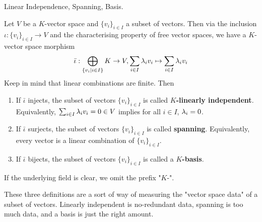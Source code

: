 \documentclass[../book.tex]{subfiles}
\begin{document}
\begin{dfn} Linear Independence, Spanning, Basis.
    
    Let $V$ be a $K$-vector space and $\{v_i\}_{i\in I}$ a subset of vectors.
    Then via the inclusion $\iota : \{v_i\}_{i\in I} \to V$ and
    the characterising property of free vector spaces, 
    we have a $K$-vector space morphism \[
        \bar\iota : \bigoplus_{\{v_i \mid i\in I\}} K \to V, 
        \sum_{i\in I}\lambda_i v_i \mapsto \sum_{i\in I}\lambda_i v_i
    \]
    Keep in mind that linear combinations are finite. 
    Then \begin{enumerate}
        \item If $\bar\iota$ injects,
        the subset of vectors $\{v_i\}_{i\in I}$ 
        is called \textbf{$K$-linearly independent}. 
        Equivalently, 
        $\sum_{i\in I} \lambda_i v_i = 0 \in V$ implies for all $i \in I$, $\lambda_i = 0$.
        \item If $\bar\iota$ surjects, 
        the subset of vectors $\{v_i\}_{i\in I}$ is called \textbf{spanning}.
        Equivalently, every vector is a linear combination of $\{v_i\}_{i\in I}$. 
        \item If $\bar\iota$ bijects,
        the subset of vectors $\{v_i\}_{i\in I}$ is called a \textbf{$K$-basis}.
    \end{enumerate}
    If the underlying field is clear, we omit the prefix "$K$-". 
    
    These three definitions are a sort of way of measuring the 
    "vector space data" of a subset of vectors.
    Linearly independent is no-redundant data, spanning is too much data, and
    a basis is just the right amount. 
\end{dfn}
\end{document}
